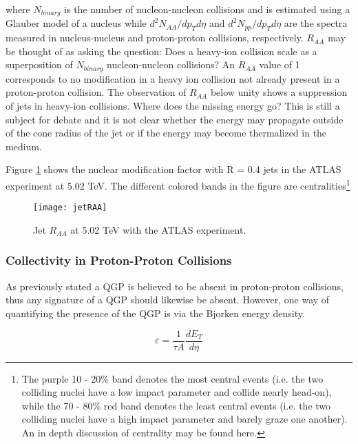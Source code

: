 \noindent
where $N_{binary}$ is the number of nucleon-nucleon collisions and is estimated using a Glauber model\cite{Miller:2007ri} of a nucleus while $d^{2}N_{AA}/dp_{T}d\eta$ and $d^{2}N_{pp}/dp_{T}d\eta$ are the spectra measured in nucleus-nucleus and proton-proton collisions, respectively.  $R_{AA}$ may be thought of as asking the question: Does a heavy-ion collision scale as a superposition of $N_{binary}$ nucleon-nucleon collisions?  An $R_{AA}$ value of 1 corresponds to no modification in a heavy ion collision not already present in a proton-proton collision.  The observation of $R_{AA}$ below unity shows a suppression of jets in heavy-ion collisions.  Where does the missing energy go?  This is still a subject for debate and it is not clear whether the energy may propagate outside of the cone radius of the jet or if the energy may become thermalized in the medium.


Figure \ref{fig:JetRAA} shows the nuclear modification factor with R = 0.4 jets in the ATLAS experiment at 5.02 TeV\cite{Aaboud:2018twu}.  The different colored bands in the figure are centralities\footnote{The purple 10 - 20\% band denotes the most central events (i.e. the two colliding nuclei have a low impact parameter and collide nearly head-on), while the 70 - 80\% red band denotes the least central events (i.e. the two colliding nuclei have a high impact parameter and barely graze one another).  An in depth discussion of centrality may be found here\cite{Klochkov_2017}.}

\begin{figure}[h]
\texttt{[image: jetRAA]}
\centering
\caption{Jet $R_{AA}$ at 5.02 TeV with the ATLAS experiment\cite{Aaboud:2018twu}.}
\label{fig:JetRAA}
\end{figure}



\subsubsection{Collectivity in Proton-Proton Collisions}
As previously stated a QGP is believed to be absent in proton-proton collisions, thus any signature of a QGP should likewise be absent.  However, one way of quantifying the presence of the QGP is via the Bjorken energy density.  

\begin{equation}
\varepsilon = \frac{1}{\tau A} \frac{dE_{T}}{d \eta}
\label{eq:bjorkenEt}
\end{equation}

